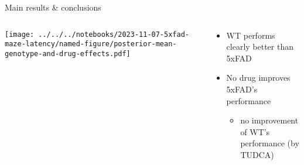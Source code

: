 \documentclass[aspectratio=169]{beamer}
\begin{document}
\begin{frame}{Main results \& conclusions}
\begin{columns}[t]
\begin{column}{0.5\textwidth}

\texttt{[image: ../../../notebooks/2023-11-07-5xfad-maze-latency/named-figure/posterior-mean-genotype-and-drug-effects.pdf]}
\end{column}

\begin{column}{0.5\textwidth}
\begin{itemize}
  \item WT performs clearly better than 5xFAD
  \item No drug improves 5xFAD's performance
  \begin{itemize}
    \item no improvement of WT's performance (by TUDCA)
  \end{itemize}
\end{itemize}
\end{column}
\end{columns}
\end{frame}
\end{document}

